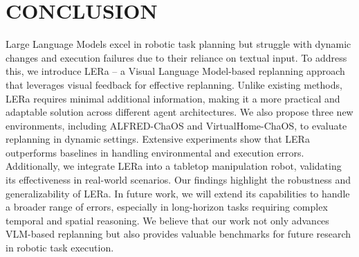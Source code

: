 \documentclass[letterpaper, 10 pt, conference]{ieeeconf}  %
\begin{document}

\section{CONCLUSION}
\label{sec:conclusion}
Large Language Models excel in robotic task planning but struggle with dynamic changes and execution failures due to their reliance on textual input. To address this, we introduce LERa -- a Visual Language Model-based replanning approach that leverages visual feedback for effective replanning. Unlike existing methods, LERa requires minimal additional information, making it a more practical and adaptable solution across different agent architectures.
We also propose three new environments, including ALFRED-ChaOS and VirtualHome-ChaOS, to evaluate replanning in dynamic settings. Extensive experiments show that LERa outperforms baselines in handling environmental and execution errors. Additionally, we integrate LERa into a tabletop manipulation robot, validating its effectiveness in real-world scenarios. Our findings highlight the robustness and generalizability of LERa. In future work, we will extend its capabilities to handle a broader range of errors, especially in long-horizon tasks requiring complex temporal and spatial reasoning. We believe that our work not only advances VLM-based replanning but also provides valuable benchmarks for future research in robotic task execution.



\end{document}
